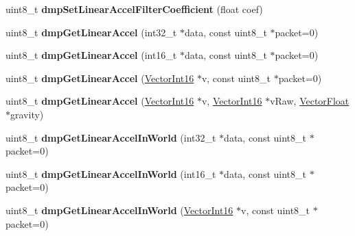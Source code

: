 \begin{DoxyCompactItemize}
\item 
\mbox{\label{class_m_p_u6050_a7142bff552ab1e980cba38f97772eecd}} 
uint8\+\_\+t {\bfseries dmp\+Set\+Linear\+Accel\+Filter\+Coefficient} (float coef)
\item 
\mbox{\label{class_m_p_u6050_aa36d05bce800803489ae4da91f63ed2d}} 
uint8\+\_\+t {\bfseries dmp\+Get\+Linear\+Accel} (int32\+\_\+t $\ast$data, const uint8\+\_\+t $\ast$packet=0)
\item 
\mbox{\label{class_m_p_u6050_ac3a746d1a5c2d9973f2315bd998fb102}} 
uint8\+\_\+t {\bfseries dmp\+Get\+Linear\+Accel} (int16\+\_\+t $\ast$data, const uint8\+\_\+t $\ast$packet=0)
\item 
\mbox{\label{class_m_p_u6050_a72cfa08b409ce18689f19b81bd285780}} 
uint8\+\_\+t {\bfseries dmp\+Get\+Linear\+Accel} (\mbox{\hyperlink{class_vector_int16}{Vector\+Int16}} $\ast$v, const uint8\+\_\+t $\ast$packet=0)
\item 
\mbox{\label{class_m_p_u6050_aa58cddb02075ed4e7ae0afa51cfdce7d}} 
uint8\+\_\+t {\bfseries dmp\+Get\+Linear\+Accel} (\mbox{\hyperlink{class_vector_int16}{Vector\+Int16}} $\ast$v, \mbox{\hyperlink{class_vector_int16}{Vector\+Int16}} $\ast$v\+Raw, \mbox{\hyperlink{class_vector_float}{Vector\+Float}} $\ast$gravity)
\item 
\mbox{\label{class_m_p_u6050_a1c63096808722eafb96e88e41a4af115}} 
uint8\+\_\+t {\bfseries dmp\+Get\+Linear\+Accel\+In\+World} (int32\+\_\+t $\ast$data, const uint8\+\_\+t $\ast$packet=0)
\item 
\mbox{\label{class_m_p_u6050_a097673d9ae96274ab711aaef7827411d}} 
uint8\+\_\+t {\bfseries dmp\+Get\+Linear\+Accel\+In\+World} (int16\+\_\+t $\ast$data, const uint8\+\_\+t $\ast$packet=0)
\item 
\mbox{\label{class_m_p_u6050_a848b210e89382c1f7c7fb3ee679b3852}} 
uint8\+\_\+t {\bfseries dmp\+Get\+Linear\+Accel\+In\+World} (\mbox{\hyperlink{class_vector_int16}{Vector\+Int16}} $\ast$v, const uint8\+\_\+t $\ast$packet=0)
\item 
\mbox{\label{class_m_p_u6050_a6c09e9168261daff945d1e0757598b61}} 

\end{DoxyCompactItemize}
